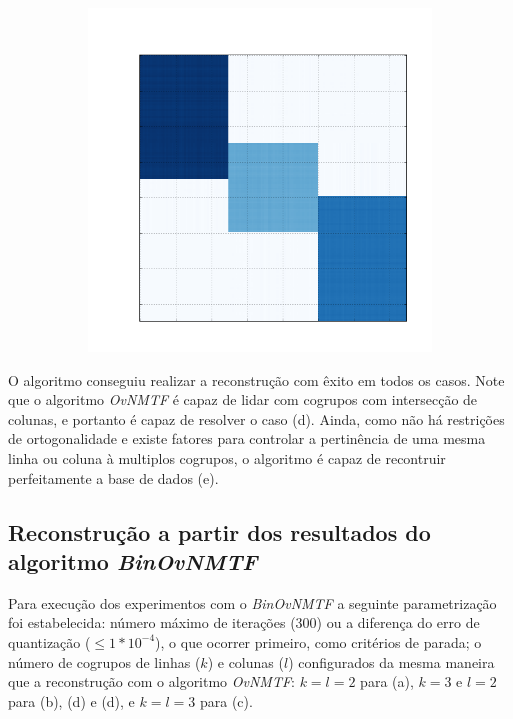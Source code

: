 \documentclass[
    12pt,                %
    oneside,            %
    a4paper,            %
    english,            %
    brazil                %
    ]{abntex2ppgsi}
\begin{document}
\begin{figure}[H]
\begin{subfigure}[b]{0.18\textwidth}
        \caption{}
    \end{subfigure}
    \begin{subfigure}[b]{0.18\textwidth}
        \includegraphics[width=\textwidth]{img/e-reconstruction-ovnmtf.png}
        \caption{}
    \end{subfigure}
    \label{fig:reconstruction:ovnmtf}
\end{figure}

O algoritmo conseguiu realizar a reconstrução com êxito em todos os casos.
Note que o algoritmo \textit{OvNMTF} é capaz de lidar com cogrupos com intersecção de colunas, e portanto é capaz de resolver o caso (d).
Ainda, como não há restrições de ortogonalidade e existe fatores para controlar a pertinência de uma mesma linha ou coluna à multiplos cogrupos, o algoritmo é capaz de recontruir perfeitamente a base de dados (e).

\subsection{Reconstrução a partir dos resultados do algoritmo \textit{BinOvNMTF}}
\label{subsec:results-reconstruction-binovnmtf}

Para execução dos experimentos com o \textit{BinOvNMTF} a seguinte parametrização foi estabelecida: número máximo de iterações ($300$) ou a diferença do erro de quantização ($\leq 1 * 10^{-4}$), o que ocorrer primeiro, como critérios de parada; o número de cogrupos de linhas ($k$) e colunas ($l$) configurados da mesma maneira que a reconstrução com o algoritmo \textit{OvNMTF}: $k = l = 2$ para (a), $k = 3$ e $l = 2$ para (b), (d) e (d), e $k = l = 3$ para (c).
\end{document}
